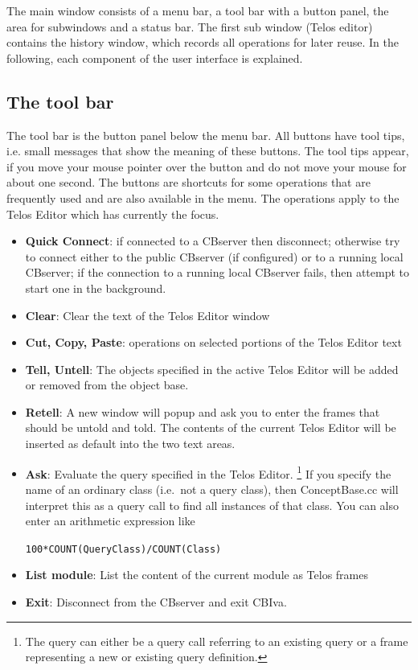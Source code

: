 
The main window consists of a menu bar, a tool bar with a button panel, the area for
subwindows and a status bar. The first sub window (Telos editor) contains the history window,
which records all operations for later reuse.
In the following, each component of the user interface is explained.

\subsection{The tool bar}

The tool bar is the button panel below the menu bar. All buttons have tool tips, i.e. small
messages that show the meaning of these buttons. The tool tips appear, if you move your mouse pointer
over the button and do not move your mouse for about one second. The buttons are shortcuts
for some operations that are frequently used and are also available in the menu.
The operations apply to the Telos Editor which has currently the focus.

\begin{itemize}
\item {\bf Quick Connect}: if connected to a CBserver then disconnect; otherwise try to
 connect either to the public CBserver (if configured) or to a running local CBserver; 
 if the connection to a running local CBserver fails, then attempt to start one in the background.
\item {\bf Clear}: Clear the text of the Telos Editor window
\item {\bf Cut, Copy, Paste}: operations on selected portions of the Telos Editor text
\item {\bf Tell, Untell}: The objects specified in the active Telos Editor will be added or removed
from the object base.
\item {\bf Retell}: A new window will popup and ask you to enter the frames that should be untold and
told. The contents of the current Telos Editor will be inserted as default into the two text areas.

\item {\bf Ask}: Evaluate the query specified in the Telos Editor. \footnote{The query can either be a query call
referring to an existing query
or a frame representing a new or existing query definition.} If you specify the name of an ordinary class (i.e.\
not a query class), then ConceptBase.cc will interpret this as a query call to find all instances of that class.
You can also enter an arithmetic expression like\newline
  \centerline{{\tt 100*COUNT(QueryClass)/COUNT(Class)}}
\item {\bf List module}: List the content of the current module as Telos frames
\item {\bf Exit}: Disconnect from the CBserver and exit CBIva.
\end{itemize}



